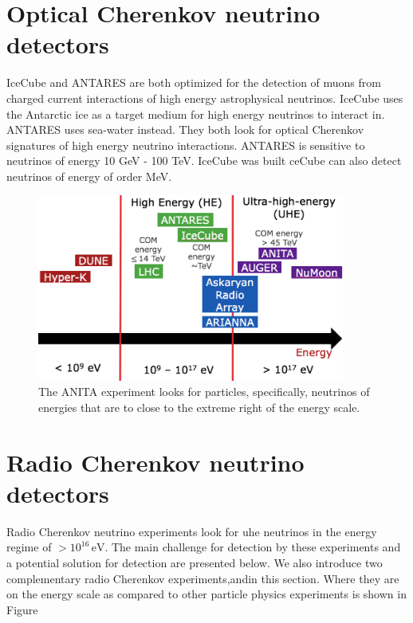 \section{Optical Cherenkov neutrino detectors}


IceCube and ANTARES are both optimized for the detection of muons from charged current interactions of high energy astrophysical neutrinos. IceCube uses the Antarctic ice as a target medium for high energy neutrinos to interact in. ANTARES uses sea-water instead. They both look for optical Cherenkov signatures of high energy neutrino interactions. ANTARES is sensitive to neutrinos of energy 10 GeV - 100 TeV. IceCube was built ceCube can also detect neutrinos of energy of order MeV. 


\begin{figure}
\centering
\includegraphics[width=0.9\textwidth]{figures/anita_where_energy.png}
\caption{The ANITA experiment looks for particles, specifically, neutrinos of energies that are to close to the extreme right of the energy scale.}
\label{anita_energy}
\end{figure}


\section{Radio Cherenkov neutrino detectors}

Radio Cherenkov neutrino experiments look for \gls{uhe} neutrinos in the energy regime of $> 10^{16}\,\mathrm{eV}$. The main challenge for detection by these experiments and a potential solution for detection are presented below. We also introduce two complementary radio Cherenkov experiments,andin this section. Where they are on the energy scale as compared to other particle physics experiments is shown in Figure



